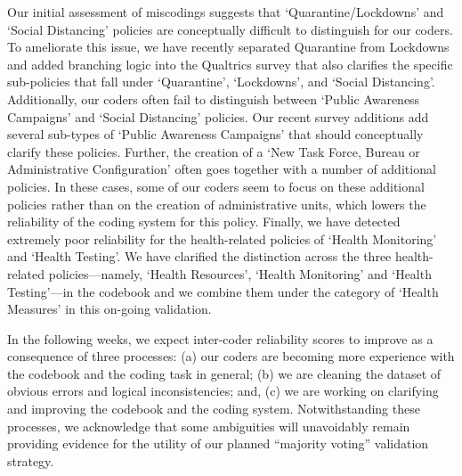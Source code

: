 \documentclass[]{article}
\begin{document}
Our initial assessment of miscodings suggests that `Quarantine/Lockdowns' and `Social Distancing' policies are conceptually difficult to distinguish for our coders. To ameliorate this issue, we have recently separated Quarantine from Lockdowns and added branching logic into the Qualtrics survey that also clarifies the specific sub-policies that fall under `Quarantine', `Lockdowns', and `Social Distancing'. Additionally, our coders often fail to distinguish between `Public Awareness Campaigns' and `Social Distancing' policies. Our recent survey additions add several sub-types of `Public Awareness Campaigns' that should conceptually clarify these policies. Further, the creation of a `New Task Force, Bureau or Administrative Configuration' often goes together with a number of additional policies. In these cases, some of our coders seem to focus on these additional policies rather than on the creation of administrative units, which lowers the reliability of the coding system for this policy. Finally, we have detected extremely poor reliability for the health-related policies of `Health Monitoring' and `Health Testing'. We have clarified the distinction across the three health-related policies---namely, `Health Resources', `Health Monitoring' and `Health Testing'---in the codebook and we combine them under the category of `Health Measures' in this on-going validation.

In the following weeks, we expect inter-coder reliability scores to improve as a consequence of three processes: (a) our coders are becoming more experience with the codebook and the coding task in general; (b) we are cleaning the dataset of obvious errors and logical inconsistencies; and, (c) we are working on clarifying and improving the codebook and the coding system. Notwithstanding these processes, we acknowledge that some ambiguities will unavoidably remain providing evidence for the utility of our planned ``majority voting'' validation strategy.
\end{document}
